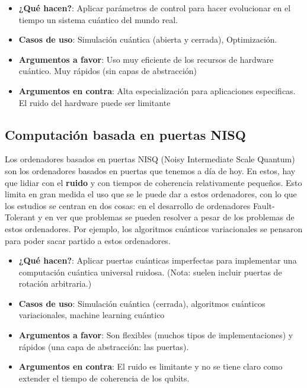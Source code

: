 \begin{itemize}
\item \textbf{¿Qué hacen?}: Aplicar parámetros de control para hacer evolucionar en el tiempo un sistema cuántico del mundo real.

\item \textbf{Casos de uso}: Simulación cuántica (abierta y cerrada), Optimización.

\item \textbf{Argumentos a favor}: Uso muy eficiente de los recursos de hardware cuántico. Muy rápidos (sin capas de abstracción)

\item \textbf{Argumentos en contra}: Alta especialización para aplicaciones especificas. El ruido del hardware puede ser limitante
\end{itemize}


\subsection{Computación basada en puertas NISQ}

Los ordenadores basados en puertas NISQ (Noisy Intermediate Scale Quantum) son los ordenadores basados en puertas que tenemos a día de hoy. En estos, hay que lidiar con el \textbf{ruido} y con tiempos de coherencia relativamente pequeños. Esto limita en gran medida el uso que se le puede dar a estos ordenadores, con lo que los estudios se centran en dos cosas: en el desarrollo de ordenadores Fault-Tolerant y en ver que problemas se pueden resolver a pesar de los problemas de estos ordenadores. Por ejemplo, los algoritmos cuánticos variacionales se pensaron para poder sacar partido a estos ordenadores.


\begin{itemize}
\item \textbf{¿Qué hacen?}: Aplicar puertas cuánticas imperfectas para implementar una computación cuántica universal ruidosa. (Nota: suelen incluir puertas de rotación arbitraria.)

\item \textbf{Casos de uso}: Simulación cuántica (cerrada), algoritmos cuánticos variacionales, machine learning cuántico

\item \textbf{Argumentos a favor}: Son flexibles (muchos tipos de implementaciones) y rápidos (una capa de abstracción: las puertas).

\item \textbf{Argumentos en contra}: El ruido es limitante y no se tiene claro como extender el tiempo de coherencia de los qubits.

\end{itemize}



